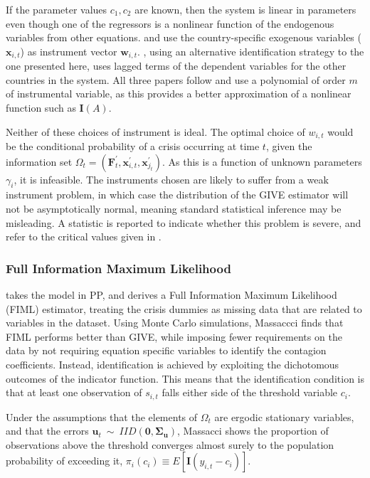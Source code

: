 \documentclass[../base.tex]{subfiles}
\begin{document}
If the parameter values $c_1, c_2$ are known, then the system is linear in parameters even though one of the regressors is a nonlinear function of the endogenous variables from other equations. \cite{pesaran2007econometrics} and \cite{massacci2007identification} use the country-specific exogenous variables ($\mathbf{x}_{i,t}$) as instrument vector $\mathbf{w}_{i,t}$. \cite{metiu2012sovereign}, using an alternative identification strategy to the one presented here, uses lagged terms of the dependent variables for the other countries in the system. All three papers follow \cite{kelejian1971two} and use a polynomial of order $m$ of instrumental variable, as this provides a better approximation of a nonlinear function such as $\mathbf{I}(A)$.

Neither of these choices of instrument is ideal. The optimal choice of $w_{i,t}$ would be the conditional probability of a crisis occurring at time $t$, given the information set $\Omega_t = (\mathbf{F}_t^\prime, \mathbf{x}_{i,t}^{\prime}, \mathbf{x}_{j_t}^{\prime})$. As this is a function of unknown parameters $\gamma_i$, it is infeasible. The instruments chosen are likely to suffer from a weak instrument problem, in which case the distribution of the GIVE estimator will not be asymptotically normal, meaning standard statistical inference may be misleading. A \cite{cragg1993testing} statistic is reported to indicate whether this problem is severe, and refer to the critical values given in \cite{stock2005testing}.

\subsubsection{Full Information Maximum Likelihood}

\cite{massacci2007identification} takes the model in PP, and derives a Full Information Maximum Likelihood (FIML) estimator, treating the crisis dummies as missing data that are related to variables in the dataset. Using Monte Carlo simulations, Massaccci finds that FIML performs better than GIVE, while imposing fewer requirements on the data by not requiring equation specific variables to identify the contagion coefficients. Instead, identification is achieved by exploiting the dichotomous outcomes of the indicator function. This means that the identification condition is that at least one observation of $s_{i,t}$ falls either side of the threshold variable $c_i$. 

Under the assumptions that the elements of $\Omega_t$ are ergodic stationary variables, and that the errors $\mathbf{u}_t~\sim~IID(\mathbf{0}, \mathbf{\Sigma_u})$, Massacci shows the proportion of observations above the threshold converges almost surely to the population probability of exceeding it, $\pi_i (c_i) \equiv \mathit{E}[\mathbf{I}(y_{i,t} -c_i)]$.
\end{document}
